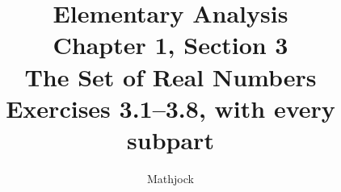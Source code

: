 
\title{\textbf{Elementary Analysis}\\[0.3em]
Chapter 1, Section 3\\[0.3em]
\large The Set of Real Numbers\\
Exercises 3.1--3.8, with every subpart}
\author{Mathjock}
\date{}

\maketitle
\bookinfo
\tableofcontents
\clearpage
\setcounter{section}{2}


